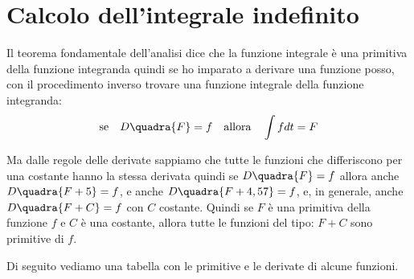 \section{Calcolo dell'integrale indefinito}
\label{sec:integrali_indefiniti}

Il teorema fondamentale dell'analisi dice che la funzione integrale è una 
primitiva della funzione integranda quindi se ho imparato a derivare una 
funzione posso, con il procedimento inverso trovare una funzione integrale 
della funzione integranda:
\[\text{se} \quad D \quadra{F} = f \quad \text{allora} \quad \int f dt = F\]

Ma dalle regole delle derivate sappiamo che tutte le funzioni che 
differiscono per una costante hanno la stessa derivata quindi se 
\(D \quadra{F} = f\) allora anche \(D \quadra{F+5} = f\), e anche 
\(D \quadra{F+4,57} = f\), e, in generale, anche \(D \quadra{F+C} = f\) con 
\(C\) costante.
Quindi se \(F\) è una primitiva della funzione \(f\) e \(C\) è una 
costante, allora tutte le funzioni del tipo: \(F + C\) sono primitive di 
\(f\).

Di seguito vediamo una tabella con le primitive e le derivate di alcune 
funzioni.

